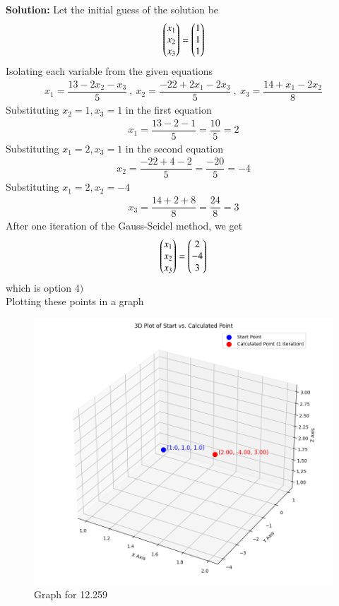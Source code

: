 \documentclass[journal,12pt,onecolumn]{IEEEtran}
\theoremstyle{remark}
\begin{document}
\textbf{Solution:}
Let the initial guess of the solution be 
\begin{align}
    \begin{pmatrix}x_1 \\ x_2\\ x_3\end{pmatrix}=\begin{pmatrix}1 \\1 \\1\end{pmatrix}
\end{align}
Isolating each variable from the given equations 
\begin{align}
    x_1=\dfrac{13-2x_2-x_3}{5} \ , \ 
    x_2=\dfrac{-22+2x_1-2x_3}{5} \ , \ 
    x_3=\dfrac{14+x_1-2x_2}{8}
\end{align}
Substituting $x_2=1, x_3=1$ in the first equation
\begin{align}
    x_1=\dfrac{13-2-1}{5} = \dfrac{10}{5} =2
\end{align}
Substituting $x_1=2 , x_3=1$ in the second equation
\begin{align}
    x_2=\dfrac{-22+4 -2}{5} = \dfrac{-20}{5} =-4
\end{align}
Substituting $x_1=2, x_2 = -4$
\begin{align}
    x_3=\dfrac{14+2+8}{8}=\dfrac{24}{8}=3
\end{align}
After one iteration of the Gauss-Seidel method, we get
\begin{align}
    \begin{pmatrix}x_1 \\ x_2 \\ x_3 \end{pmatrix}=\begin{pmatrix}2 \\ -4 \\ 3\end{pmatrix}
\end{align}
which is option $4)$\\
Plotting these points in a graph
\begin{figure}
    \centering
    \includegraphics[width=0.5\columnwidth]{figs/1.png}
    \caption{Graph for 12.259}
    \label{fig:placeholder}
\end{figure}
\end{document}
